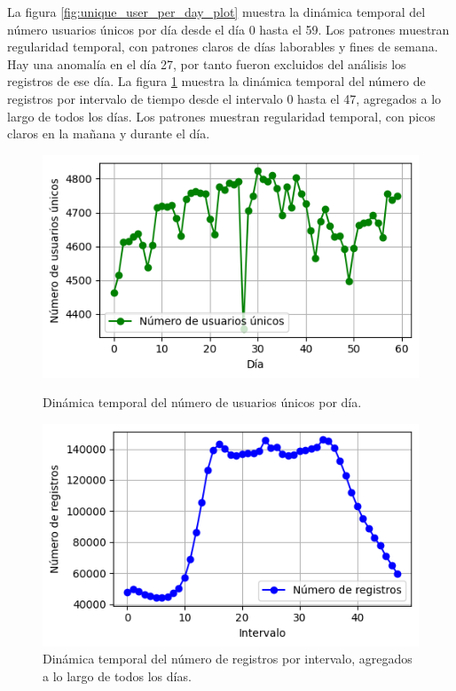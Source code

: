 La figura \ref{fig:unique_user_per_day_plot} muestra la dinámica temporal del número usuarios únicos por día desde el día 0 hasta el 59. Los patrones muestran regularidad temporal, con patrones claros de días laborables y fines de semana. Hay una anomalía en el día 27, por tanto fueron excluidos del análisis los registros de ese día. La figura \ref{fig:ping_per_timeslot_plot} muestra la dinámica temporal del número de registros por intervalo de tiempo desde el intervalo 0 hasta el 47, agregados a lo largo de todos los días. Los patrones muestran regularidad temporal, con picos claros en la mañana y durante el día.

\begin{figure}[!htb]
\centering
\begin{minipage}{0.45\textwidth}
    \centering
    \includegraphics[width=\textwidth]{Graphics/unique_user_per_day_plot.png}
    \caption{Dinámica temporal del número de usuarios únicos por día.}
    \label{fig:unique_user_per_day_plot}
\end{minipage}%
\hfill
\begin{minipage}{0.45\textwidth}
    \centering
    \includegraphics[width=\textwidth]{Graphics/ping_per_timeslot_plot.png}
    \caption{Dinámica temporal del número de registros por intervalo, agregados a lo largo de todos los días.}
    \label{fig:ping_per_timeslot_plot}
\end{minipage}%
\end{figure}

